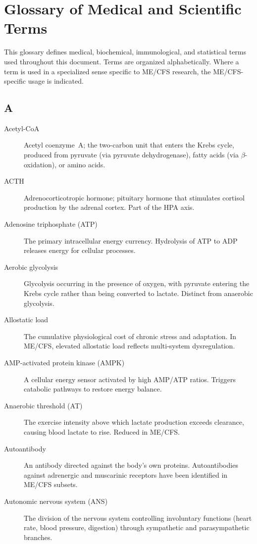 \chapter{Glossary of Medical and Scientific Terms}
\label{app:glossary}

This glossary defines medical, biochemical, immunological, and statistical terms used throughout this document. Terms are organized alphabetically. Where a term is used in a specialized sense specific to ME/CFS research, the ME/CFS-specific usage is indicated.

\section*{A}

\begin{description}
\item[Acetyl-CoA] Acetyl coenzyme~A; the two-carbon unit that enters the Krebs cycle, produced from pyruvate (via pyruvate dehydrogenase), fatty acids (via $\beta$-oxidation), or amino acids.
\item[ACTH] Adrenocorticotropic hormone; pituitary hormone that stimulates cortisol production by the adrenal cortex. Part of the HPA axis.
\item[Adenosine triphosphate (ATP)] The primary intracellular energy currency. Hydrolysis of ATP to ADP releases energy for cellular processes.
\item[Aerobic glycolysis] Glycolysis occurring in the presence of oxygen, with pyruvate entering the Krebs cycle rather than being converted to lactate. Distinct from anaerobic glycolysis.
\item[Allostatic load] The cumulative physiological cost of chronic stress and adaptation. In ME/CFS, elevated allostatic load reflects multi-system dysregulation.
\item[AMP-activated protein kinase (AMPK)] A cellular energy sensor activated by high AMP/ATP ratios. Triggers catabolic pathways to restore energy balance.
\item[Anaerobic threshold (AT)] The exercise intensity above which lactate production exceeds clearance, causing blood lactate to rise. Reduced in ME/CFS.
\item[Autoantibody] An antibody directed against the body's own proteins. Autoantibodies against adrenergic and muscarinic receptors have been identified in ME/CFS subsets.
\item[Autonomic nervous system (ANS)] The division of the nervous system controlling involuntary functions (heart rate, blood pressure, digestion) through sympathetic and parasympathetic branches.
\end{description}

